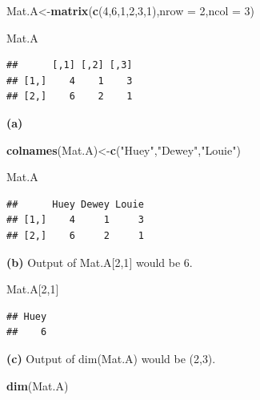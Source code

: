 \documentclass[
  openany]{book}
\newenvironment{Shaded}{\begin{snugshade}}{\end{snugshade}}
\newcommand{\AttributeTok}[1]{\textcolor[rgb]{0.13,0.29,0.53}{#1}}
\newcommand{\DecValTok}[1]{\textcolor[rgb]{0.00,0.00,0.81}{#1}}
\newcommand{\FunctionTok}[1]{\textcolor[rgb]{0.13,0.29,0.53}{\textbf{#1}}}
\newcommand{\NormalTok}[1]{#1}
\newcommand{\OtherTok}[1]{\textcolor[rgb]{0.56,0.35,0.01}{#1}}
\newcommand{\StringTok}[1]{\textcolor[rgb]{0.31,0.60,0.02}{#1}}
\begin{document}
\begin{Shaded}
\begin{Highlighting}[]
\NormalTok{Mat.A}\OtherTok{\textless{}{-}}\FunctionTok{matrix}\NormalTok{(}\FunctionTok{c}\NormalTok{(}\DecValTok{4}\NormalTok{,}\DecValTok{6}\NormalTok{,}\DecValTok{1}\NormalTok{,}\DecValTok{2}\NormalTok{,}\DecValTok{3}\NormalTok{,}\DecValTok{1}\NormalTok{),}\AttributeTok{nrow =} \DecValTok{2}\NormalTok{,}\AttributeTok{ncol =} \DecValTok{3}\NormalTok{)}

\NormalTok{Mat.A}
\end{Highlighting}
\end{Shaded}

\begin{verbatim}
##      [,1] [,2] [,3]
## [1,]    4    1    3
## [2,]    6    2    1
\end{verbatim}

\textbf{(a)}

\begin{Shaded}
\begin{Highlighting}[]
\FunctionTok{colnames}\NormalTok{(Mat.A)}\OtherTok{\textless{}{-}}\FunctionTok{c}\NormalTok{(}\StringTok{"Huey"}\NormalTok{,}\StringTok{"Dewey"}\NormalTok{,}\StringTok{"Louie"}\NormalTok{)}

\NormalTok{Mat.A}
\end{Highlighting}
\end{Shaded}

\begin{verbatim}
##      Huey Dewey Louie
## [1,]    4     1     3
## [2,]    6     2     1
\end{verbatim}

\textbf{(b)} Output of Mat.A{[}2,1{]} would be 6.

\begin{Shaded}
\begin{Highlighting}[]
\NormalTok{Mat.A[}\DecValTok{2}\NormalTok{,}\DecValTok{1}\NormalTok{]}
\end{Highlighting}
\end{Shaded}

\begin{verbatim}
## Huey 
##    6
\end{verbatim}

\textbf{(c)} Output of dim(Mat.A) would be (2,3).

\begin{Shaded}
\begin{Highlighting}[]
\FunctionTok{dim}\NormalTok{(Mat.A)}
\end{Highlighting}
\end{Shaded}
\end{document}
